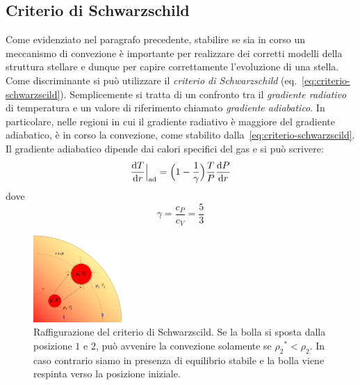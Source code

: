 \subsection{Criterio di Schwarzschild}
Come evidenziato nel paragrafo precedente, stabilire se sia in corso un meccanismo di convezione è importante per realizzare dei corretti modelli della struttura stellare e dunque per capire correttamente l'evoluzione di una stella. Come discriminante si può utilizzare il \emph{criterio di Schwarzschild} (eq.~\eqref{eq:criterio-schwarzscild}). Semplicemente si tratta di un confronto tra il \emph{gradiente radiativo} di temperatura e un valore di riferimento chiamato \emph{gradiente adiabatico}. In particolare, nelle regioni in cui il gradiente radiativo è maggiore del gradiente adiabatico, è in corso la convezione, come stabilito dalla~\eqref{eq:criterio-schwarzscild}. Il gradiente adiabatico dipende dai calori specifici del gas e si può scrivere:
\begin{equation}\label{eq:gradiente-adiabatico}
    \dfrac{\mathop{\mathrm{{}d}}\mathopen{} T}{\mathop{\mathrm{{}d}}\mathopen{} r}\Big|_\textup{ad} = \Bigl(1- \frac{1}{\gamma}\Bigr) \dfrac{T}{P} \dfrac{\mathop{\mathrm{{}d}}\mathopen{} P}{\mathop{\mathrm{{}d}}\mathopen{} r}
\end{equation}
dove
\[
\gamma =\frac{c_P}{c_V} = \frac{5}{3}
\]

\begin{figure}
\centering
\includegraphics[width=0.3\textwidth]{immagini/criterio-schwarzscild.png}
\caption{Raffigurazione del criterio di Schwarzscild. Se la bolla si sposta dalla posizione $1$ e $2$, può avvenire la convezione solamente se ${\rho_2}^* < \rho_2$. In caso contrario siamo in presenza di equilibrio stabile e la bolla viene respinta verso la posizione iniziale.}
\label{fig:criterio-schwarzscild}
\end{figure}

